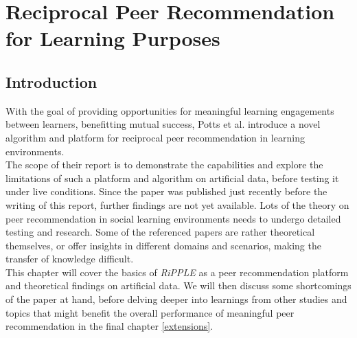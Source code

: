 \documentclass[nochapterpage,bigchapter,linedtoc,longdoc,colorback,accentcolor=tud3b,oneside]{tudreport}
\begin{document}
\chapter{Reciprocal Peer Recommendation for Learning Purposes} \label{paper}
\section{Introduction} \label{paper:introduction}
With the goal of providing opportunities for meaningful learning engagements between learners, benefitting mutual success, Potts et al. introduce a novel algorithm and platform for reciprocal peer recommendation in learning environments. \cite{potts2018reciprocal}\\
The scope of their report is to demonstrate the capabilities and explore the limitations of such a platform and algorithm on artificial data, before testing it under live conditions. Since the paper was published just recently before the writing of this report, further findings are not yet available. Lots of the theory on peer recommendation in social learning environments needs to undergo detailed testing and research. Some of the referenced papers are rather theoretical themselves, or offer insights in different domains and scenarios, making the transfer of knowledge difficult.\\
This chapter will cover the basics of \textit{RiPPLE} as a peer recommendation platform and theoretical findings on artificial data. We will then discuss some shortcomings of the paper at hand, before delving deeper into learnings from other studies and topics that might benefit the overall performance of meaningful peer recommendation in the final chapter \ref{extensions}.\\
\end{document}
